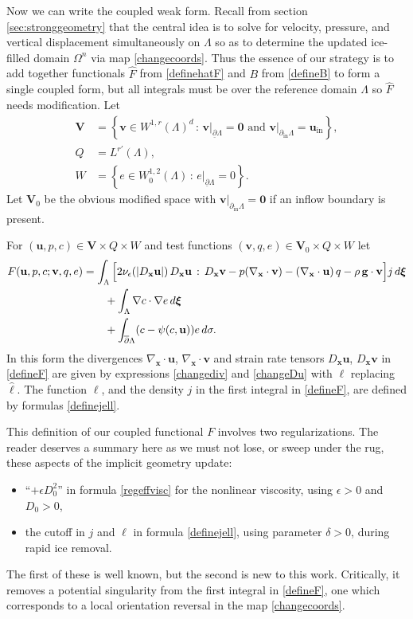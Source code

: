 \documentclass[letterpaper,final,12pt,reqno]{amsart}
\newcommand{\eps}{\epsilon}
\newcommand{\grad}{\nabla}
\newcommand{\bu}{\mathbf{u}}
\newcommand{\bv}{\mathbf{v}}
\newcommand{\bx}{\mathbf{x}}
\newcommand{\bV}{\mathbf{V}}
\newcommand{\bxi}{\bm{\xi}}
\newcommand{\bzero}{\bm{0}}
\begin{document}
Now we can write the coupled weak form.  Recall from section \ref{sec:stronggeometry} that the central idea is to solve for velocity, pressure, and vertical displacement simultaneously on $\Lambda$ so as to determine the updated ice-filled domain $\Omega^n$ via map \eqref{changecoords}.  Thus the essence of our strategy is to add together functionals $\hat F$ from \eqref{definehatF} and $B$ from \eqref{defineB} to form a single coupled form, but all integrals must be over the reference domain $\Lambda$ so $\hat F$ needs modification.  Let
\begin{align*}
\bV &= \left\{\bv \in W^{1,r}(\Lambda)^d\,:\,\bv\big|_{\underline{\partial} \Lambda}=\bzero \text{ and } \bv\big|_{\partial_{\text{in}} \Lambda} = \bu_{\text{in}}\right\}, \\
Q   &= L^{r'}(\Lambda), \\
W   &= \left\{e \in W_0^{1,2}(\Lambda)\,:\,e\big|_{\underline{\partial} \Lambda} = 0\right\}.
\end{align*}
Let $\bV_0$ be the obvious modified space with $\bv\big|_{\partial_{\text{in}} \Lambda} = \bzero$ if an inflow boundary is present.

For $(\bu,p,c) \in \bV\times Q\times W$ and test functions $(\bv,q,e) \in \bV_0\times Q\times W$ let
\begin{align}
F(\bu,p,c;\bv,q,e) &= \int_{\Lambda} \Big[2 \nu_\eps(|D_\bx\bu|)\, D_\bx\bu\,:\,D_\bx\bv - p (\nabla_\bx \cdot \bv) - \left(\nabla_\bx \cdot \bu\right) q - \rho\, \mathbf{g} \cdot \bv\Big] j \,d\bxi \notag \\
&\qquad + \int_\Lambda \grad c \cdot \grad e \,d\bxi \notag \\
&\qquad + \int_{\overline{\partial} \Lambda} (c - \psi(c,\bu)) e\,d\sigma. \label{defineF}
\end{align}
In this form the divergences $\grad_\bx \cdot\bu$, $\grad_\bx \cdot\bv$ and strain rate tensors $D_\bx\bu$, $D_\bx\bv$ in \eqref{defineF} are given by expressions \eqref{changediv} and \eqref{changeDu} with $\ell$ replacing $\hat\ell$.  The function $\ell$, and the density $j$ in the first integral in \eqref{defineF}, are defined by formulas \eqref{definejell}.

This definition of our coupled functional $F$ involves two regularizations.  The reader deserves a summary here as we must not lose, or sweep under the rug, these aspects of the implicit geometry update:
\begin{itemize}
\item ``$+\eps D_0^2$'' in formula \eqref{regeffvisc} for the nonlinear viscosity, using $\eps>0$ and $D_0>0$,
\item the cutoff in $j$ and $\ell$ in formula \eqref{definejell}, using parameter $\delta>0$, during rapid ice removal.
\end{itemize}
The first of these is well known, but the second is new to this work.  Critically, it removes a potential singularity from the first integral in \eqref{defineF}, one which corresponds to a local orientation reversal in the map \eqref{changecoords}.
\end{document}
